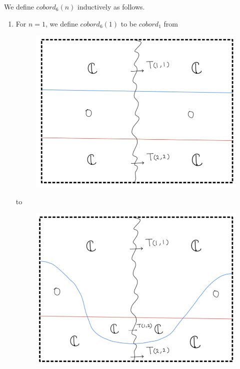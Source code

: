 We define $cobord_6(n)$ inductively as follows.
\begin{enumerate}[label=(\roman*)]
\item For $n=1$, we define $cobord_6(1)$ to be $cobord_1$ from
\begin{figure}[H]
    \centering
    \includegraphics[scale = 0.95]{diagrams/cobord6/2.png}
    \caption{}
    \label{fig:your-label}
\end{figure}
to
\begin{figure}[H]
    \centering
    \includegraphics[scale = 0.95]{diagrams/cobord6/3.png}
    \caption{}
    \label{fig:your-label}
\end{figure}


\end{enumerate}
